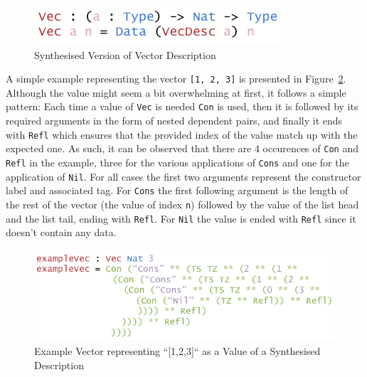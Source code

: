 \documentclass{ituthesis}
\newcommand{\ttconstructor}[1]{\textcolor{constructor-color}{\texttt{#1}}}
\newcommand{\tttype}[1]{\textcolor{type-color}{\texttt{#1}}}
\newcommand{\ttdec}[1]{\textcolor{declared-var-color}{\texttt{#1}}}
\newcommand{\ttvar}[1]{\textcolor{local-var-color}{\texttt{#1}}}
\newcommand{\ttliteral}[1]{\textcolor{literal-color}{\texttt{#1}}}
\theoremstyle{definition}
\begin{document}
\begin{figure}[ht]
\begin{center}
    \includegraphics[scale=0.5]{Figures/VectorSynthesisedDesc.png}
\end{center}
\caption{Synthesised Version of Vector Description}
\label{fig:synthversvecdesc}
\end{figure}

A simple example representing the vector \ttliteral{[1, 2, 3]} is presented in Figure~\ref{fig:exmvecsynthvecdesc}. Although the value might seem a bit overwhelming at first, it follows a simple pattern:
Each time a value of \ttdec{Vec} is needed \ttconstructor{Con} is used, then it is followed by its required arguments in the form of nested dependent pairs, and finally it ends with \tttype{Refl} which ensures
that the provided index of the value match up with the expected one.
As such, it can be observed that there are 4 occurences of \ttconstructor{Con} and \ttconstructor{Refl} in the example, three for the various applications
of \ttconstructor{Cons} and one for the application of \ttconstructor{Nil}. For all cases the first two arguments represent the constructor label and associated tag. 
For \ttconstructor{Cons} the first following argument is the length of the rest of the vector (the value of index \ttvar{n}) followed by the value of the list head and the list tail, ending with \tttype{Refl}.
For \ttconstructor{Nil} the value is ended with \ttconstructor{Refl} since it doesn't contain any data.


\begin{figure}[ht]
\begin{center}
    \includegraphics[scale=0.5]{Figures/VectorSynthesisedExample.png}
\end{center}
\caption{Example Vector representing ``[1,2,3]`` as a Value of a Synthesised Description}
\label{fig:exmvecsynthvecdesc}
\end{figure}
\end{document}
